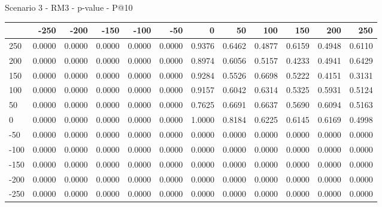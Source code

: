 Scenario 3 - RM3 - p-value - P@10
\begin{tabular}{lrrrrrrrrrrr}
\toprule
{} &   -250 &   -200 &   -150 &   -100 &   -50  &    0   &    50  &    100 &    150 &    200 &    250 \\
\midrule
 250 & 0.0000 & 0.0000 & 0.0000 & 0.0000 & 0.0000 & 0.9376 & 0.6462 & 0.4877 & 0.6159 & 0.4948 & 0.6110 \\
 200 & 0.0000 & 0.0000 & 0.0000 & 0.0000 & 0.0000 & 0.8974 & 0.6056 & 0.5157 & 0.4233 & 0.4941 & 0.6429 \\
 150 & 0.0000 & 0.0000 & 0.0000 & 0.0000 & 0.0000 & 0.9284 & 0.5526 & 0.6698 & 0.5222 & 0.4151 & 0.3131 \\
 100 & 0.0000 & 0.0000 & 0.0000 & 0.0000 & 0.0000 & 0.9157 & 0.6042 & 0.6314 & 0.5325 & 0.5931 & 0.5124 \\
 50  & 0.0000 & 0.0000 & 0.0000 & 0.0000 & 0.0000 & 0.7625 & 0.6691 & 0.6637 & 0.5690 & 0.6094 & 0.5163 \\
 0   & 0.0000 & 0.0000 & 0.0000 & 0.0000 & 0.0000 & 1.0000 & 0.8184 & 0.6225 & 0.6145 & 0.6169 & 0.4998 \\
-50  & 0.0000 & 0.0000 & 0.0000 & 0.0000 & 0.0000 & 0.0000 & 0.0000 & 0.0000 & 0.0000 & 0.0000 & 0.0000 \\
-100 & 0.0000 & 0.0000 & 0.0000 & 0.0000 & 0.0000 & 0.0000 & 0.0000 & 0.0000 & 0.0000 & 0.0000 & 0.0000 \\
-150 & 0.0000 & 0.0000 & 0.0000 & 0.0000 & 0.0000 & 0.0000 & 0.0000 & 0.0000 & 0.0000 & 0.0000 & 0.0000 \\
-200 & 0.0000 & 0.0000 & 0.0000 & 0.0000 & 0.0000 & 0.0000 & 0.0000 & 0.0000 & 0.0000 & 0.0000 & 0.0000 \\
-250 & 0.0000 & 0.0000 & 0.0000 & 0.0000 & 0.0000 & 0.0000 & 0.0000 & 0.0000 & 0.0000 & 0.0000 & 0.0000 \\
\bottomrule
\end{tabular}

